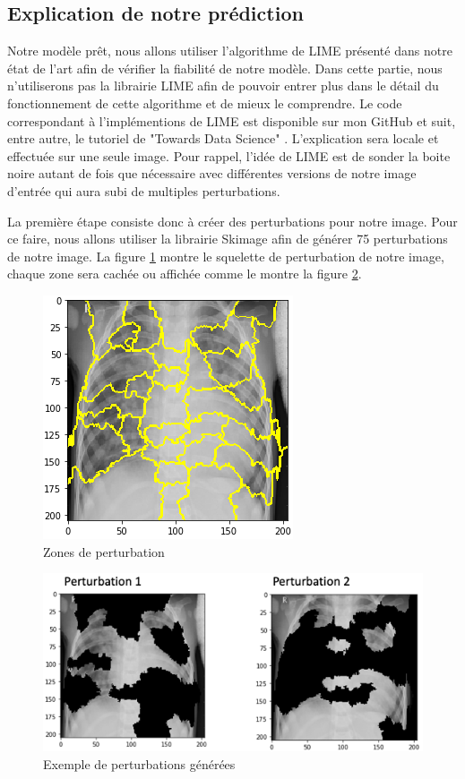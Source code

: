 \subsection{Explication de notre prédiction}
Notre modèle prêt, nous allons utiliser l'algorithme de LIME présenté dans notre état de l'art afin de vérifier la fiabilité de notre modèle. Dans cette partie, nous n'utiliserons pas la librairie LIME afin de pouvoir entrer plus dans le détail du fonctionnement de cette algorithme et de mieux le comprendre. Le code correspondant à l'implémentions de LIME est disponible sur mon GitHub \cite{limeMyDepot} et suit, entre autre, le tutoriel de "Towards Data Science" \cite{limeTuto}. L'explication sera locale et effectuée sur une seule image. Pour rappel,  l’idée de LIME est de sonder la boite noire autant de fois que nécessaire avec différentes versions de notre image d'entrée qui aura subi de multiples perturbations.\par
La première étape consiste donc à créer des perturbations pour notre image. Pour ce faire, nous allons utiliser la librairie Skimage afin de générer 75 perturbations de notre image. La figure \ref{limePerturbSchema} montre le squelette de perturbation de notre image, chaque zone sera cachée ou affichée comme le montre la figure \ref{limePerturbExemple}.\par
\begin{figure}[h]
    \includegraphics[scale=0.6]{src_img/limePerturbSchema.png}
    \caption{Zones de perturbation}
    \label{limePerturbSchema}
\end{figure}

\begin{figure}[h]
    \includegraphics[scale=0.7]{src_img/limePerturbations.png}
    \caption{Exemple de perturbations générées}
    \label{limePerturbExemple}
\end{figure}

